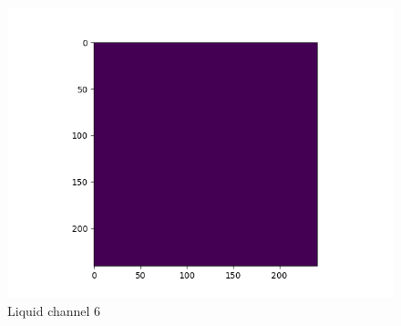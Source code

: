 \documentclass[12pt,reqno]{amsart}
\numberwithin{equation}{section}
\begin{document}
\begin{enumerate}
\begin{figure}[H]
\centering
\includegraphics[scale=0.6]{liquid_channel_6}
\caption{Liquid channel 6}
\end{figure}

\end{enumerate}
\end{document}
